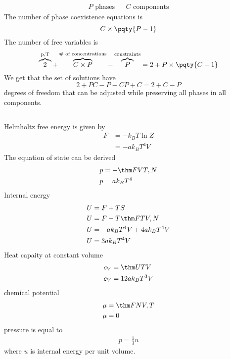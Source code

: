 \documentclass[12pt]{article}
\begin{document}
        \subsubsection{}   \begin{align*}
            P \text{ phases}&& C\text{ components}
        \end{align*} The number of phase coexistence equations is \[
            C \times \pqty{P - 1}
        \]
        The number of free variables is \[
            \overbrace{2}^\text{p,T}+ \overbrace{C\times P }^\text{\# of concentrations} - \overbrace{P}^\text{constraints}=2+ P \times \pqty{C-1}
        \]
        We get that the set of solutions have
        \[
            2 + PC - P - CP + C = 2 + C - P
        \]
        degrees of freedom that can be adjusted while preserving all phases in all components.
        \subsection{} Helmholtz free energy is given by\begin{align*}
            F &=  - k_BT\ln Z\\
            &=  - ak_BT^4 V 
        \end{align*}
        The equation of state can be derived \begin{align*}
            p &=  -\thm FV{T,N}\\
            p &= ak_BT^4
        \end{align*}
        Internal energy\begin{align*}
            U &= F + TS\\
            U &= F - T\thm FT{V,N}\\
            U &= -ak_BT^4V + 4ak_BT^4V\\
            U &= 3ak_BT^4V
        \end{align*}
        Heat capaity at constant volume
        \begin{align*}
            c_V &= \thm UTV\\
            c_V &= 12ak_BT^3V
        \end{align*}
        chemical potential
        \begin{align*}
            \mu &= \thm FN{V,T}\\
            \mu &= 0
        \end{align*}
        pressure is equal to \begin{align*}
            p = \frac{1}{3} u
        \end{align*}
        where \(u\) is internal energy per unit volume.
\end{document}
